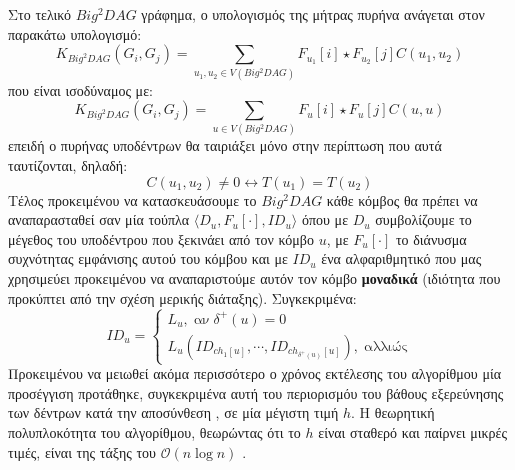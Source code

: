 Στο τελικό $Big^{2}DAG$ γράφημα, ο υπολογισμός της μήτρας πυρήνα ανάγεται στον παρακάτω υπολογισμό:
\begin{equation}
K_{Big^{2}DAG}(G_{i}, G_{j}) = \sum_{u_{1}, u_{2} \in V(Big^{2}DAG)} F_{u_{1}}[i] \star F_{u_{2}}[j] C(u_{1}, u_{2})
\end{equation}
που είναι ισοδύναμος με:
\begin{equation}
K_{Big^{2}DAG}(G_{i}, G_{j}) = \sum_{u \in V(Big^{2}DAG)} F_{u}[i] \star F_{u}[j] C(u, u)
\end{equation}
επειδή ο πυρήνας υποδέντρων θα ταιριάξει μόνο στην περίπτωση που αυτά ταυτίζονται, δηλαδή:
\begin{equation}
C(u_{1}, u_{2}) \not= 0 \leftrightarrow T(u_{1}) = T(u_{2})
\end{equation}
Τέλος προκειμένου να κατασκευάσουμε το $Big^{2}DAG$ κάθε κόμβος θα πρέπει να αναπαρασταθεί σαν μία τούπλα $\langle D_{u} , F_{u}[\cdot], ID_{u} \rangle$ όπου με $D_{u}$ συμβολίζουμε το μέγεθος του υποδέντρου που ξεκινάει από τον κόμβο $u$, με $F_{u}[\cdot]$ το διάνυσμα συχνότητας εμφάνισης αυτού του κόμβου και με $ID_{u}$ ένα αλφαριθμητικό που μας χρησιμεύει προκειμένου να αναπαριστούμε αυτόν τον κόμβο \textbf{μοναδικά} (ιδιότητα που προκύπτει από την σχέση μερικής διάταξης).
Συγκεκριμένα:
\begin{equation}
ID_{u} = \begin{cases}
            L_{u},\;\text{αν}\;\delta^{+}(u)=0\\
            L_{u}(ID_{ch_{1}[u]}, \cdots, ID_{ch_{\delta^{+}(u)}[u]}),\;\text{αλλιώς}
        \end{cases}
\end{equation}
Προκειμένου να μειωθεί ακόμα περισσότερο ο χρόνος εκτέλεσης του αλγορίθμου μία προσέγγιση προτάθηκε, συγκεκριμένα αυτή του περιορισμόυ του βάθους εξερεύνησης των δέντρων  κατά την αποσύνθεση , σε μία μέγιστη τιμή $h$.
Η θεωρητική πολυπλοκότητα του αλγορίθμου, θεωρώντας ότι το $h$ είναι σταθερό και παίρνει μικρές τιμές, είναι της τάξης του $\mathcal{O}(n\log n)$ \cite[]{Martino2012ATK}.

